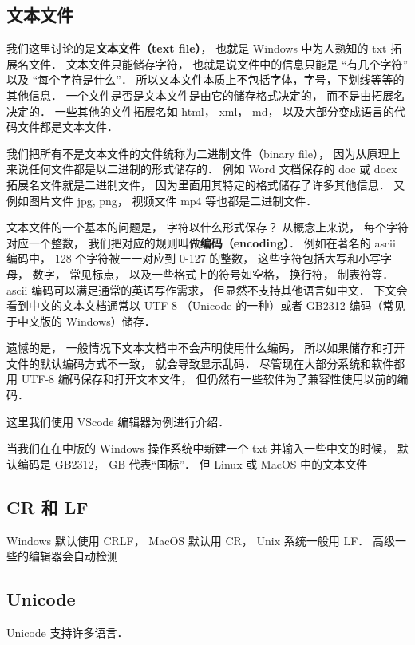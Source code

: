 
\subsection{文本文件}
我们这里讨论的是\textbf{文本文件（text file）}， 也就是 Windows 中为人熟知的 txt 拓展名文件． 文本文件只能储存字符， 也就是说文件中的信息只能是 “有几个字符” 以及 “每个字符是什么”． 所以文本文件本质上不包括字体，字号，下划线等等的其他信息． 一个文件是否是文本文件是由它的储存格式决定的， 而不是由拓展名决定的． 一些其他的文件拓展名如 html， xml， md， 以及大部分变成语言的代码文件都是文本文件．

我们把所有不是文本文件的文件统称为二进制文件（binary file）， 因为从原理上来说任何文件都是以二进制的形式储存的． 例如 Word 文档保存的 doc 或 docx 拓展名文件就是二进制文件， 因为里面用其特定的格式储存了许多其他信息．  又例如图片文件 jpg, png， 视频文件 mp4 等也都是二进制文件．

文本文件的一个基本的问题是， 字符以什么形式保存？ 从概念上来说， 每个字符对应一个整数， 我们把对应的规则叫做\textbf{编码（encoding）}． 例如在著名的 ascii 编码中， 128 个字符被一一对应到 0-127 的整数， 这些字符包括大写和小写字母， 数字， 常见标点， 以及一些格式上的符号如空格， 换行符， 制表符等． ascii 编码可以满足通常的英语写作需求， 但显然不支持其他语言如中文． 下文会看到中文的文本文档通常以 UTF-8 （Unicode 的一种）或者 GB2312 编码（常见于中文版的 Windows）储存．

遗憾的是， 一般情况下文本文档中不会声明使用什么编码， 所以如果储存和打开文件的默认编码方式不一致， 就会导致显示乱码． 尽管现在大部分系统和软件都用 UTF-8 编码保存和打开文本文件， 但仍然有一些软件为了兼容性使用以前的编码．

这里我们使用 VScode 编辑器为例进行介绍．

当我们在在中版的 Windows 操作系统中新建一个 txt 并输入一些中文的时候， 默认编码是 GB2312， GB 代表“国标”． 但 Linux 或 MacOS 中的文本文件

\subsection{CR 和 LF}
Windows 默认使用 CRLF， MacOS 默认用 CR， Unix 系统一般用 LF． 高级一些的编辑器会自动检测

\subsection{Unicode}
Unicode 支持许多语言．
